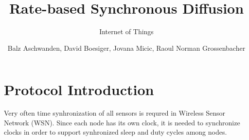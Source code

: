 \documentclass{llncs}
\begin{document}
\title{Rate-based Synchronous Diffusion}


\subtitle{Internet of Things}


\author{Balz Aschwanden, David Boesiger, Jovana Micic,  Raoul Norman Grossenbacher} 








\maketitle


\begin{comment}
Protocol introduction: Maximum 1 page about the theoretical basics of the experiment.
\end{comment}
\section{Protocol Introduction}
Very often time synhronization of all sensors is requred in Wireless Sensor Network (WSN). Since each node has its own clock, it is  needed to synchronize clocks in order to support synhronized sleep and duty cycles among nodes.
\end{document}
